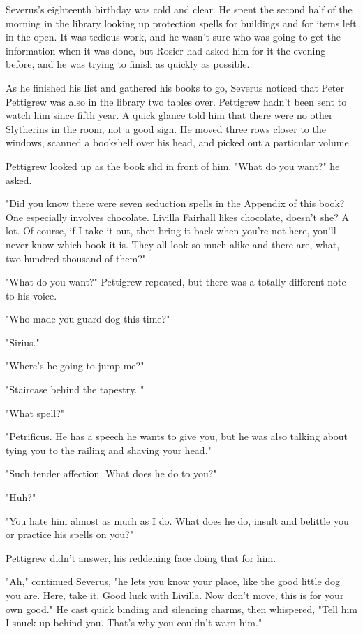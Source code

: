 Severus's eighteenth birthday was cold and clear. He spent the second half of the morning in the library looking up protection spells for buildings and for items left in the open. It was tedious work, and he wasn't sure who was going to get the information when it was done, but Rosier had asked him for it the evening before, and he was trying to finish as quickly as possible.

As he finished his list and gathered his books to go, Severus noticed that Peter Pettigrew was also in the library two tables over. Pettigrew hadn't been sent to watch him since fifth year. A quick glance told him that there were no other Slytherins in the room, not a good sign. He moved three rows closer to the windows, scanned a bookshelf over his head, and picked out a particular volume.

Pettigrew looked up as the book slid in front of him. "What do you want?" he asked.

"Did you know there were seven seduction spells in the Appendix of this book? One especially involves chocolate. Livilla Fairhall likes chocolate, doesn't she? A lot. Of course, if I take it out, then bring it back when you're not here, you'll never know which book it is. They all look so much alike and there are, what, two hundred thousand of them?"

"What do you want?" Pettigrew repeated, but there was a totally different note to his voice.

"Who made you guard dog this time?"

"Sirius."

"Where's he going to jump me?"

"Staircase behind the tapestry. "

"What spell?"

"Petrificus. He has a speech he wants to give you, but he was also talking about tying you to the railing and shaving your head."

"Such tender affection. What does he do to you?"

"Huh?"

"You hate him almost as much as I do. What does he do, insult and belittle you or practice his spells on you?"

Pettigrew didn't answer, his reddening face doing that for him.

"Ah," continued Severus, "he lets you know your place, like the good little dog you are. Here, take it. Good luck with Livilla. Now don't move, this is for your own good." He cast quick binding and silencing charms, then whispered, "Tell him I snuck up behind you. That's why you couldn't warn him."

